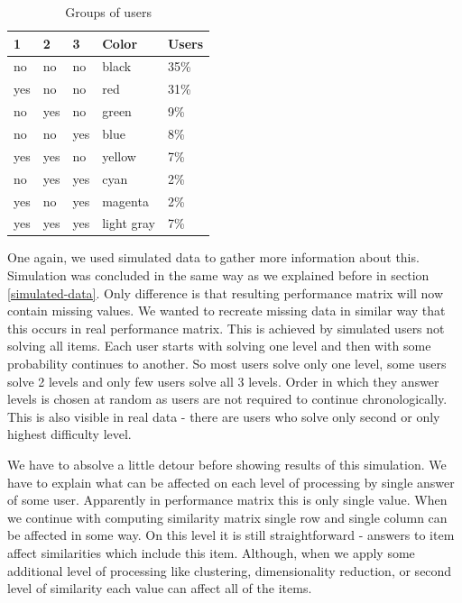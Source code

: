 \documentclass[
  digital, %
  table,   %
  nolof,     %
  nolot,     %
  nocover
]{fithesis3}
\begin{document}
\begin{table}
  \begin{tabular}{ | l | l | l | l | l | }
    \hline
  	1   & 2   & 3   & Color      & Users \\ \hline
  	no  & no  & no  & black      & 35\%  \\ \hline
  	yes & no  & no  & red        & 31\%  \\ \hline
  	no  & yes & no  & green      & 9\%   \\ \hline
  	no  & no  & yes & blue       & 8\%   \\ \hline
  	yes & yes & no  & yellow     & 7\%   \\ \hline
  	no  & yes & yes & cyan       & 2\%   \\ \hline
  	yes & no  & yes & magenta    & 2\%   \\ \hline
  	yes & yes & yes & light gray & 7\%   \\ \hline
    \hline
  \end{tabular}
  \caption{Groups of users}
  \label{tab:user-groups}
\end{table}


One again, we used simulated data to gather more information about this. Simulation was concluded in the same way as we explained before in section \ref{simulated-data}. Only difference is that resulting performance matrix will now contain missing values. We wanted to recreate missing data in similar way that this occurs in real performance matrix. This is achieved by simulated users not solving all items. Each user starts with solving one level and then with some probability continues to another. So most users solve only one level, some users solve 2 levels and only few users solve all 3 levels. Order in which they answer levels is chosen at random as users are not required to continue chronologically. This is also visible in real data - there are users who solve only second or only highest difficulty level.



We have to absolve a little detour before showing results of this simulation. We have to explain what can be affected on each level of processing by single answer of some user. Apparently in performance matrix this is only single value. When we continue with computing similarity matrix single row and single column can be affected in some way. On this level it is still straightforward - answers to item affect similarities which include this item. Although, when we apply some additional level of processing like clustering, dimensionality reduction, or second level of similarity each value can affect all of the items.
\end{document}
